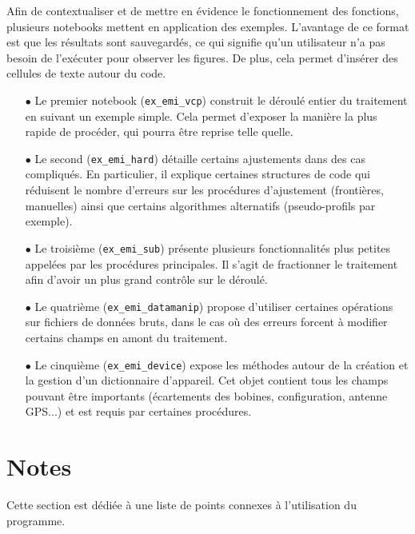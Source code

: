 \documentclass[12pt]{article}
\begin{document}
    Afin de contextualiser et de mettre en évidence le fonctionnement des fonctions, plusieurs notebooks mettent en application des exemples. L'avantage de ce format est que les résultats sont sauvegardés, ce qui signifie qu'un utilisateur n'a pas besoin de l'exécuter pour observer les figures. De plus, cela permet d'insérer des cellules de texte autour du code.

    \begin{enumerate}
        \item[$\bullet$] Le premier notebook (\texttt{ex_emi_vcp}) construit le déroulé entier du traitement en suivant un exemple simple. Cela permet d'exposer la manière la plus rapide de procéder, qui pourra être reprise telle quelle.

        \item[$\bullet$] Le second (\texttt{ex_emi_hard}) détaille certains ajustements dans des cas compliqués. En particulier, il explique certaines structures de code qui réduisent le nombre d'erreurs sur les procédures d'ajustement (frontières, manuelles) ainsi que certains algorithmes alternatifs (pseudo-profils par exemple).

        \item[$\bullet$] Le troisième (\texttt{ex_emi_sub}) présente plusieurs fonctionnalités plus petites appelées par les procédures principales. Il s'agit de fractionner le traitement afin d'avoir un plus grand contrôle sur le déroulé.
        
        \item[$\bullet$] Le quatrième (\texttt{ex_emi_datamanip}) propose d'utiliser certaines opérations sur fichiers de données bruts, dans le cas où des erreurs forcent à modifier certains champs en amont du traitement.

        \item[$\bullet$] Le cinquième (\texttt{ex_emi_device}) expose les méthodes autour de la création et la gestion d'un dictionnaire d'appareil. Cet objet contient tous les champs pouvant être importants (écartements des bobines, configuration, antenne GPS...) et est requis par certaines procédures.
    \end{enumerate}

\newpage
\section{Notes}

    Cette section est dédiée à une liste de points connexes à l'utilisation du programme.
\end{document}

